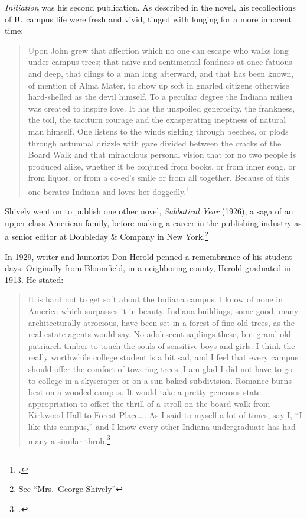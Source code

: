 \documentclass[
  american,
  letterpaper,
]{scrreprt}
\begin{document}
\emph{Initiation} was his second publication. As described in the novel,
his recollections of IU campus life were fresh and vivid, tinged with
longing for a more innocent time:

\begin{quote}
Upon John grew that affection which no one can escape who walks long
under campus trees; that naïve and sentimental fondness at once fatuous
and deep, that clings to a man long afterward, and that has been known,
of mention of Alma Mater, to show up soft in gnarled citizens otherwise
hard-shelled as the devil himself. To a peculiar degree the Indiana
milieu was created to inspire love. It has the unspoiled generosity, the
frankness, the toil, the taciturn courage and the exasperating ineptness
of natural man himself. One listens to the winds sighing through
beeches, or plods through autumnal drizzle with gaze divided between the
cracks of the Board Walk and that miraculous personal vision that for no
two people is produced alike, whether it be conjured from books, or from
inner song, or from liquor, or from a co-ed's smile or from all
together. Because of this one berates Indiana and loves her
doggedly.\footnote{.}
\end{quote}

Shively went on to publish one other novel, \emph{Sabbatical Year}
(1926), a saga of an upper-class American family, before making a career
in the publishing industry as a senior editor at Doubleday \& Company in
New York.\footnote{See
  \href{https://www.nytimes.com/1973/02/06/archives/mrs-george-shively.html?smid=url-share}{``Mrs.~George
  Shively''}}

In 1929, writer and humorist Don Herold penned a remembrance of his
student days. Originally from Bloomfield, in a neighboring county,
Herold graduated in 1913. He stated:

\begin{quote}
It is hard not to get soft about the Indiana campus. I know of none in
America which surpasses it in beauty. Indiana buildings, some good, many
architecturally atrocious, have been set in a forest of fine old trees,
as the real estate agents would say. No adolescent saplings these, but
grand old patriarch timber to touch the souls of sensitive boys and
girls. I think the really worthwhile college student is a bit sad, and I
feel that every campus should offer the comfort of towering trees. I am
glad I did not have to go to college in a skyscraper or on a sun-baked
subdivision. Romance burns best on a wooded campus. It would take a
pretty generous state appropriation to offset the thrill of a stroll on
the board walk from Kirkwood Hall to Forest Place\ldots. As I said to
myself a lot of times, say I, ``I like this campus,'' and I know every
other Indiana undergraduate has had many a similar throb.\footnote{.}
\end{quote}
\end{document}
